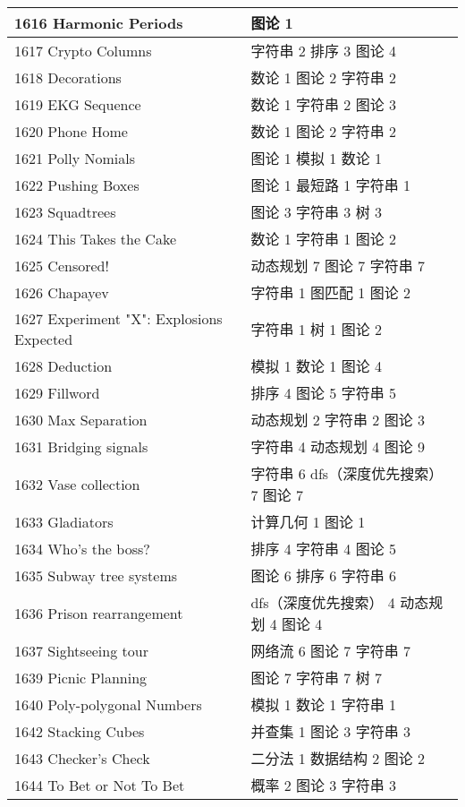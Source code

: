 \begin{longtable}{| p{} | p{} |}
 1616 Harmonic Periods  & 图论 1 \\ \hline
 1617 Crypto Columns  & 字符串 2 排序 3 图论 4 \\ \hline
 1618 Decorations  & 数论 1 图论 2 字符串 2 \\ \hline
 1619 EKG Sequence  & 数论 1 字符串 2 图论 3 \\ \hline
 1620 Phone Home  & 数论 1 图论 2 字符串 2 \\ \hline
 1621 Polly Nomials  & 图论 1 模拟 1 数论 1 \\ \hline
 1622 Pushing Boxes  & 图论 1 最短路 1 字符串 1 \\ \hline
 1623 Squadtrees  & 图论 3 字符串 3 树 3 \\ \hline
 1624 This Takes the Cake  & 数论 1 字符串 1 图论 2 \\ \hline
 1625 Censored!  & 动态规划 7 图论 7 字符串 7 \\ \hline
 1626 Chapayev  & 字符串 1 图匹配 1 图论 2 \\ \hline
 1627 Experiment "X": Explosions Expected  & 字符串 1 树 1 图论 2 \\ \hline
 1628 Deduction  & 模拟 1 数论 1 图论 4 \\ \hline
 1629 Fillword  & 排序 4 图论 5 字符串 5 \\ \hline
 1630 Max Separation  & 动态规划 2 字符串 2 图论 3 \\ \hline
 1631 Bridging signals  & 字符串 4 动态规划 4 图论 9 \\ \hline
 1632 Vase collection  & 字符串 6 dfs（深度优先搜索） 7 图论 7 \\ \hline
 1633 Gladiators  & 计算几何 1 图论 1 \\ \hline
 1634 Who's the boss?  & 排序 4 字符串 4 图论 5 \\ \hline
 1635 Subway tree systems  & 图论 6 排序 6 字符串 6 \\ \hline
 1636 Prison rearrangement  & dfs（深度优先搜索） 4 动态规划 4 图论 4 \\ \hline
 1637 Sightseeing tour  & 网络流 6 图论 7 字符串 7 \\ \hline
 1639 Picnic Planning  & 图论 7 字符串 7 树 7 \\ \hline
 1640 Poly-polygonal Numbers  & 模拟 1 数论 1 字符串 1 \\ \hline
 1642 Stacking Cubes  & 并查集 1 图论 3 字符串 3 \\ \hline
 1643 Checker's Check  & 二分法 1 数据结构 2 图论 2 \\ \hline
 1644 To Bet or Not To Bet  & 概率 2 图论 3 字符串 3 \\ \hline

\end{longtable}

